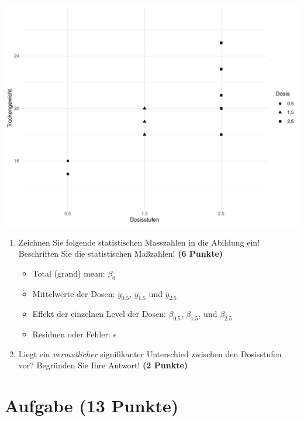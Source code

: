 \documentclass[a4paper, 10pt]{scrartcl}\usepackage[]{graphicx}\usepackage[]{xcolor}
\makeatletter
\def\maxwidth{ %
  \ifdim\Gin@nat@width>\linewidth
    \linewidth
  \else
    \Gin@nat@width
  \fi
}
\newenvironment{knitrout}{}{} %
\makeatother
\begin{document}
\begin{knitrout}
\color{fgcolor}

{\centering \includegraphics[width=\maxwidth]{img/anova-01-a-1} 

}


\end{knitrout}

\begin{enumerate}
\item Zeichnen Sie folgende statistischen Masszahlen in die Abildung ein!
  Beschriften Sie die statistischen Ma{\ss}zahlen! \textbf{(6 Punkte)}
  \begin{itemize}
  \item Total (grand) mean: $\beta_0$
  \item Mittelwerte der Dosen: $\bar{y}_{0.5}$, $\bar{y}_{1.5}$ und $\bar{y}_{2.5}$
  \item Effekt der einzelnen Level der Dosen: $\beta_{0.5}$, $\beta_{1.5}$,
    und $\beta_{2.5}$
  \item Residuen oder Fehler: $\epsilon$
  \end{itemize}
\item Liegt ein \textit{vermutlicher} signifikanter Unterschied zwischen
  den Dosisstufen vor? Begr{\"u}nden Sie Ihre Antwort! \textbf{(2 Punkte)}
\end{enumerate}
 
\clearpage

\section{Aufgabe \hfill (13 Punkte)}
\end{document}
